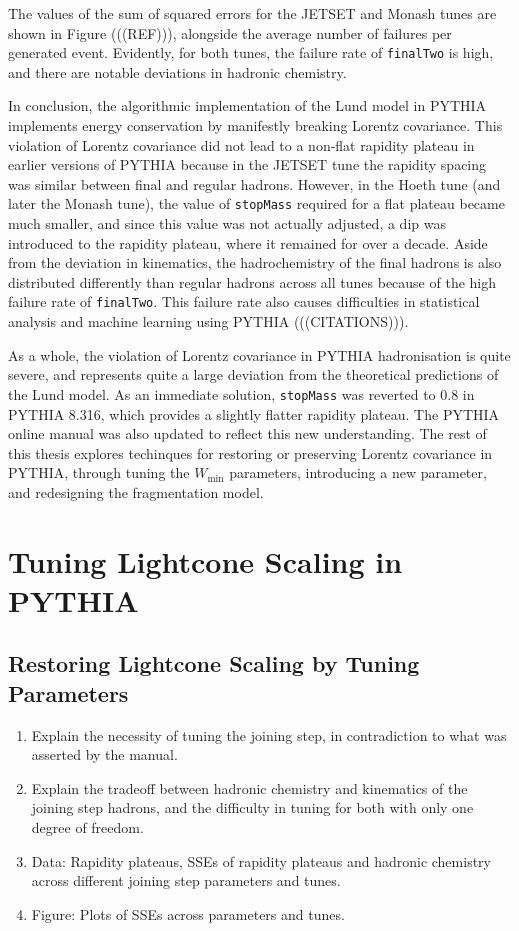 \documentclass[12pt,a4paper]{report}
\begin{document}
The values of the sum of squared errors for the JETSET and Monash tunes are shown in Figure (((REF))), alongside the average number of failures per generated event. Evidently, for both tunes, the failure rate of \texttt{finalTwo} is high, and there are notable deviations in hadronic chemistry.

In conclusion, the algorithmic implementation of the Lund model in PYTHIA implements energy conservation by manifestly breaking Lorentz covariance. This violation of Lorentz covariance did not lead to a non-flat rapidity plateau in earlier versions of PYTHIA because in the JETSET tune the rapidity spacing was similar between final and regular hadrons. However, in the Hoeth tune (and later the Monash tune), the value of \texttt{stopMass} required for a flat plateau became much smaller, and since this value was not actually adjusted, a dip was introduced to the rapidity plateau, where it remained for over a decade. Aside from the deviation in kinematics, the hadrochemistry of the final hadrons is also distributed differently than regular hadrons across all tunes because of the high failure rate of \texttt{finalTwo}. This failure rate also causes difficulties in statistical analysis and machine learning using PYTHIA (((CITATIONS))).

As a whole, the violation of Lorentz covariance in PYTHIA hadronisation is quite severe, and represents quite a large deviation from the theoretical predictions of the Lund model. As an immediate solution, \texttt{stopMass} was reverted to 0.8 in PYTHIA 8.316, which provides a slightly flatter rapidity plateau. The PYTHIA online manual was also updated to reflect this new understanding. The rest of this thesis explores techinques for restoring or preserving Lorentz covariance in PYTHIA, through tuning the $W_\text{min}$ parameters, introducing a new parameter, and redesigning the fragmentation model.

\chapter{Tuning Lightcone Scaling in PYTHIA}
\label{chap:tuning}
\section{Restoring Lightcone Scaling by Tuning Parameters}
\begin{enumerate}
\item Explain the necessity of tuning the joining step, in contradiction to what was asserted by the manual.
\item Explain the tradeoff between hadronic chemistry and kinematics of the joining step hadrons, and the difficulty in tuning for both with only one degree of freedom.
\item Data: Rapidity plateaus, SSEs of rapidity plateaus and hadronic chemistry across different joining step parameters and tunes.
\item Figure: Plots of SSEs across parameters and tunes.
\end{enumerate}
\end{document}
